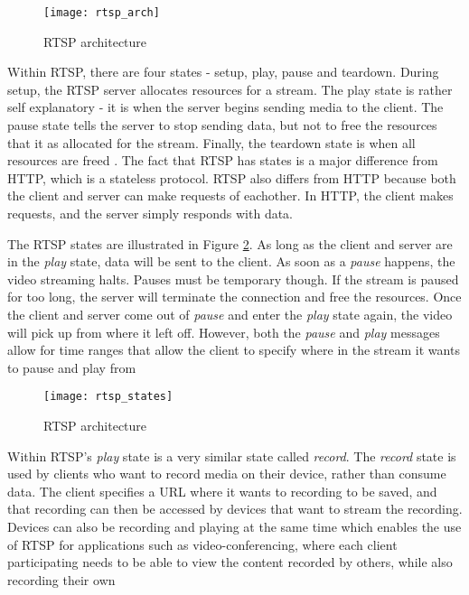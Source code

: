 \documentclass[12pt]{article}
\begin{document}
\begin{figure}[htb]
  \begin{center}
    \texttt{[image: rtsp\_arch]}
    \caption{RTSP architecture}
    \label{fig:rtsp_arch}
  \end{center}
\end{figure}

Within RTSP, there are four states - setup, play, pause and teardown.  During setup, the RTSP server allocates resources for a stream.  The play state is rather self explanatory - it is when the server begins sending media to the client.  The pause state tells the server to stop sending data, but not to free the resources that it as allocated for the stream.  Finally, the teardown state is when all resources are freed \cite{rtsp_ieee}.  The fact that RTSP has states is a major difference from HTTP, which is a stateless protocol.  RTSP also differs from HTTP because both the client and server can make requests of eachother.  In HTTP, the client makes requests, and the server simply responds with data.

The RTSP states are illustrated in Figure \ref{fig:rtsp_states}.  As long as the client and server are in the \textit{play} state, data will be sent to the client.  As soon as a \textit{pause} happens, the video streaming halts.  Pauses must be temporary though.  If the stream is paused for too long, the server will terminate the connection and free the resources.  Once the client and server come out of \textit{pause} and enter the \textit{play} state again, the video will pick up from where it left off.  However, both the \textit{pause} and \textit{play} messages allow for time ranges that allow the client to specify where in the stream it wants to pause and play from \cite{rtsp_ieee}

\begin{figure}[htb]
  \begin{center}
    \texttt{[image: rtsp\_states]}
    \caption{RTSP architecture}
    \label{fig:rtsp_states}
  \end{center}
\end{figure}

Within RTSP's \textit{play} state is a very similar state called \textit{record}.  The \textit{record} state is used by clients who want to record media on their device, rather than consume data.  The client specifies a URL where it wants to recording to be saved, and that recording can then be accessed by devices that want to stream the recording.  Devices can also be recording and playing at the same time which enables the use of RTSP for applications such as video-conferencing, where each client participating needs to be able to view the content recorded by others, while also recording their own \cite{rtsp_ieee}
\end{document}
